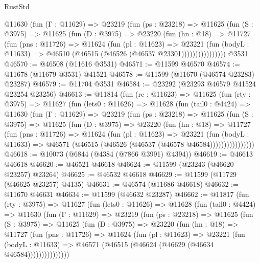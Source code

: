 \begin{lexlean}{RustStd}
\begin{coremodule}
            @11630
              (fun (Γ : @11629) =>
              @23219
                (fun (ps : @23218) =>
                @11625
                  (fun (S : @3975) =>
                  @11625
                    (fun (D : @3975) =>
                    @23220
                      (fun (hn : @18) =>
                      @11727
                        (fun (pns : @11726) =>
                        @11624
                          (fun (pl : @11623) =>
                          @23221
                            (fun (bodyL : @11633) =>
                            @46510 (@46515 (@46526 (@46537 @23301))))))))))))))))
    @3531
@46570 := @46508 (@11616 @3531)
@46571 := @11599 @46570
@46574 := @11678 (@11679 @3531) @41521
@46578 := @11599 (@11670 (@46574 @23283) @23287)
@46579 := @11704 @3531
@46584 := @23292 (@23293 @46579 @41524 @23254 @23256)
@46613 := @11814
    (fun (rc : @11623) =>
    @11625
      (fun (rty : @3975) =>
      @11627
        (fun (lets0 : @11626) =>
        @11628
          (fun (tail0 : @4424) =>
          @11630
            (fun (Γ : @11629) =>
            @23219
              (fun (ps : @23218) =>
              @11625
                (fun (S : @3975) =>
                @11625
                  (fun (D : @3975) =>
                  @23220
                    (fun (hn : @18) =>
                    @11727
                      (fun (pns : @11726) =>
                      @11624
                        (fun (pl : @11623) =>
                        @23221
                          (fun (bodyL : @11633) =>
                          @46571 (@46515 (@46526 (@46537 (@46578 @46584))))))))))))))))
@46618 := @10073 (@6844 (@4384 (@7866 @3991) @4394))
@46619 := @46613 @46618
@46620 := @46521 @46618
@46624 := @11599 (@23243 (@46620 @23257) @23264)
@46625 := @46532 @46618
@46629 := @11599 (@11729 (@46625 @23257) @4135)
@46631 := @46574 (@11686 @46618)
@46632 := @11670 @46631
@46634 := @11599 (@46632 @23287)
@46662 := @11817
    (fun (rty : @3975) =>
    @11627
      (fun (lets0 : @11626) =>
      @11628
        (fun (tail0 : @4424) =>
        @11630
          (fun (Γ : @11629) =>
          @23219
            (fun (ps : @23218) =>
            @11625
              (fun (S : @3975) =>
              @11625
                (fun (D : @3975) =>
                @23220
                  (fun (hn : @18) =>
                  @11727
                    (fun (pns : @11726) =>
                    @11624
                      (fun (pl : @11623) =>
                      @23221
                        (fun (bodyL : @11633) =>
                        @46571 (@46515 (@46624 (@46629 (@46634 @46584)))))))))))))))

\end{coremodule}
\end{lexlean}
